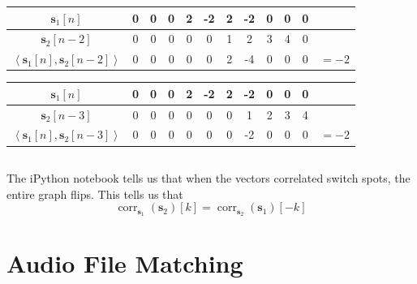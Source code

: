 \documentclass[]{article}
\newcommand{\iprod}[2]{\left\langle #1, #2 \right\rangle}
\renewcommand{\vec}[1]{\mathbf{#1}}
\newcommand{\corr}{\operatorname{corr}}
\begin{document}
\begin{flushleft}
\begin{tabular}{c|ccccccccccc}
\end{tabular} \vspace{5 mm}
\begin{tabular}{c|ccccccccccc}
	\(\vec{s}_1[n]\) & 0 & 0 & 0 & 2 & -2 & 2 & -2 & 0 & 0 & 0 \\
	\hline
	\(\vec{s}_2[n - 2]\) & 0 & 0 & 0 & 0 & 0 & 1 & 2 & 3 & 4 & 0 \\
	\hline
	\(\iprod{\vec{s}_1[n]}{\vec{s}_2[n - 2]}\) & 0 & 0 & 0 & 0 & 0 & 2 & -4 & 0 & 0 & 0 & \(= -2\) \\
\end{tabular} \vspace{5 mm}
\begin{tabular}{c|ccccccccccc}
	\(\vec{s}_1[n]\) & 0 & 0 & 0 & 2 & -2 & 2 & -2 & 0 & 0 & 0 \\
	\hline
	\(\vec{s}_2[n - 3]\) & 0 & 0 & 0 & 0 & 0 & 0 & 1 & 2 & 3 & 4 \\
	\hline
	\(\iprod{\vec{s}_1[n]}{\vec{s}_2[n - 3]}\) & 0 & 0 & 0 & 0 & 0 & 0 & -2 & 0 & 0 & 0 & \(= -2\) \\
\end{tabular} \vspace{5 mm}
\end{flushleft}

\subsection{}

The iPython notebook tells us that when the vectors correlated switch spots, the entire graph flips. This tells us that
\begin{equation}
	\corr_{\vec{s}_1}(\vec{s}_2)[k] = \corr_{\vec{s}_2}(\vec{s}_1)[-k]
\end{equation}


\section{Audio File Matching}

\subsection{}
\end{document}
